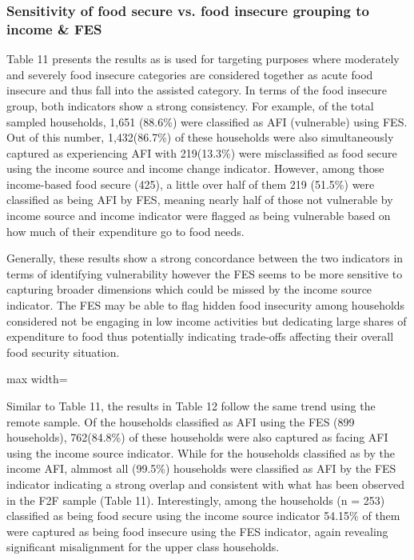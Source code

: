 \documentclass[11pt,harvard]{article}
\begin{document}
	  
	\subsubsection{Sensitivity of food secure vs. food insecure grouping to income \& FES}
	
	Table 11 presents the results as is used for targeting purposes where moderately and severely food insecure categories are considered together as acute food insecure and thus fall into the assisted category. In terms of the food insecure group, both indicators show a strong consistency. For example, of the total sampled households, 1,651 (88.6\%) were classified as AFI (vulnerable) using FES. Out of this number, 1,432(86.7\%) of these households were also simultaneously captured as experiencing AFI with  219(13.3\%) were misclassified as food secure using the income source and income change indicator. However, among those income-based food secure (425), a little over half of them 219 (51.5\%) were classified as being AFI by FES, meaning nearly half of those not vulnerable by income source and income indicator were flagged as being vulnerable based on how much of their expenditure go to food needs.
	
	Generally, these results show a strong concordance between the two indicators in terms of identifying vulnerability however the FES seems to be more sensitive to capturing broader dimensions which could be missed by the income source indicator. The FES may be able to flag hidden food insecurity among households considered not be engaging in low income activities but dedicating large shares of expenditure to food thus potentially indicating trade-offs affecting their overall food security situation.
	
	\begin{table}[htbp]
		\centering
		\begin{adjustbox}{max width=\textwidth}
			\begin{threeparttable}
				\caption{Cross Tabulation of Acute Food Insecurity (CAR\_Income vs. CARI\_FES) - F2F Sample}
				\scriptsize
				 
				\label{tab:BF_FS_Cross_Tabulation}
			\end{threeparttable}
		\end{adjustbox}
	\end{table}
	
	
	Similar to Table 11, the results in Table 12 follow the same trend using the remote sample. Of the households classified as AFI using the FES (899 households), 762(84.8\%) of these households were also captured as facing AFI using the income source indicator. While for the households classified as by the income AFI, almmost all (99.5\%) households were classified as AFI by the FES indicator indicating a strong overlap and consistent with what has been observed in the F2F sample (Table 11). Interestingly, among the households (n = 253) classified as being food secure using the income source indicator  54.15\% of them were captured as being food insecure using the FES indicator, again revealing significant misalignment for the upper class households.  
		
\end{document}
